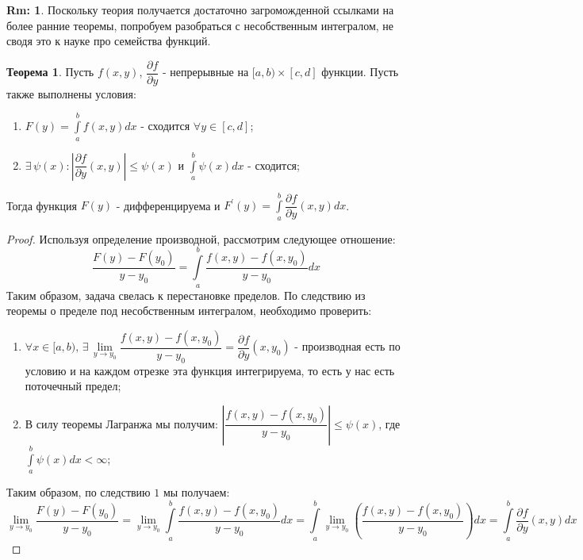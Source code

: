 \documentclass[12pt]{article}
\theoremstyle{definition}
\newtheorem{rem}{Rm:}
\newtheorem{theorem}{Теорема}
\newcommand{\ddint}[2]{\displaystyle\int\limits_{#1}^{#2}}
\begin{document}
\begin{rem}
	Поскольку теория получается достаточно загроможденной ссылками на более ранние теоремы, попробуем разобраться с несобственным интегралом, не сводя это к науке про семейства функций.
\end{rem}
\begin{theorem}
	Пусть $f(x,y)$, $\dfrac{\partial f}{\partial y}$ - непрерывные на $[a,b)\times [c,d]$ функции. Пусть также выполнены условия:
	\begin{enumerate}[label=(\Roman*)]
		\item $F(y) = \ddint{a}{b}f(x,y)dx$ - сходится $\forall y \in [c,d]$;
		\item $\exists \, \psi(x) \colon \left|\dfrac{\partial f}{\partial y}(x,y)\right|\leq \psi(x)$ и $\ddint{a}{b}\psi(x) dx$ - сходится;
	\end{enumerate}
	Тогда функция $F(y)$ - дифференцируема и $F^\prime(y) = \ddint{a}{b}\dfrac{\partial f}{\partial y}(x,y)dx$.
\end{theorem}
\begin{proof}
	Используя определение производной, рассмотрим следующее отношение:
	$$
		\dfrac{F(y) - F(y_0)}{y - y_0} = \ddint{a}{b}\dfrac{f(x,y) - f(x,y_0)}{y - y_0}dx
	$$
	Таким образом, задача свелась к перестановке пределов. По следствию из теоремы о пределе под несобственным интегралом, необходимо проверить:
	\begin{enumerate}[label=(\Roman*)]
		\item $\forall x \in [a,b), \, \exists \, \lim\limits_{y \to y_0}\dfrac{f(x,y) - f(x,y_0)}{y - y_0} = \dfrac{\partial f}{\partial y}(x,y_0)$ - производная есть по условию и на каждом отрезке эта функция интегрируема, то есть у нас есть поточечный предел;
		\item В силу теоремы Лагранжа мы получим: $\left|\dfrac{f(x,y) - f(x,y_0)}{y - y_0}\right| \leq \psi(x)$, где $\ddint{a}{b}\psi(x) dx < \infty$;
	\end{enumerate}	
	Таким образом, по следствию $1$ мы получаем:
	$$
		\lim\limits_{y\to y_0}\dfrac{F(y) - F(y_0)}{y - y_0} = \lim\limits_{y\to y_0}\ddint{a}{b}\dfrac{f(x,y) - f(x,y_0)}{y - y_0}dx = \ddint{a}{b}\lim\limits_{y\to y_0}\left(\dfrac{f(x,y) - f(x,y_0)}{y - y_0}\right)dx = \ddint{a}{b}\dfrac{\partial f}{\partial y}(x,y)dx
	$$
\end{proof}

\newpage
\end{document}
